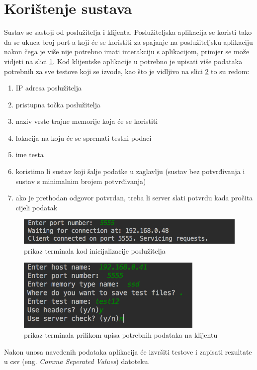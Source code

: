 \documentclass[times, utf8, zavrsni, square]{fer}
\begin{document}
\section{Korištenje sustava}
Sustav se sastoji od poslužitelja i klijenta.
Poslužiteljska aplikacija se koristi tako da se ukuca broj port-a koji će se koristiti za spajanje na poslužiteljsku aplikaciju nakon čega je više nije potrebno imati interakciju s aplikacijom, primjer se može vidjeti na slici \ref{fig:server}.
Kod klijentske aplikacije u potrebno je upisati više podataka potrebnih za sve testove koji se izvode, kao što je vidljivo na slici \ref{fig:autoClient} to su redom:
    \begin{enumerate}
    \itemsep0em
    \item IP adresa poslužitelja
    \item pristupna točka poslužitelja
    \item naziv vrste trajne memorije koja će se koristiti
    \item lokacija na koju će se spremati testni podaci
    \item ime testa
    \item koristimo li sustav koji šalje podatke u zaglavlju (sustav bez potvrđivanja i sustav s minimalnim brojem potvrđivanja)
    \item ako je prethodan odgovor potvrdan, treba li server slati potvrdu kada pročita cijeli podatak
    \end{enumerate}
    \begin{figure}[t]
        \centering
        \includegraphics[width=1\textwidth]{server}
        \caption{prikaz terminala kod inicijalizacije poslužitelja }
        \label{fig:server}
    \end{figure}
    \begin{figure}[t]
        \centering
        \includegraphics[width=0.8\textwidth]{autoClient}
        \caption{prikaz terminala prilikom upisa potrebnih podataka na klijentu}
        \label{fig:autoClient}
    \end{figure}
Nakon unosa navedenih podataka aplikacija će izvršiti testove i zapisati rezultate u csv (eng.\textit{ Comma Seperated Values}) datoteku.
\end{document}
